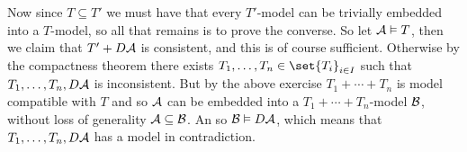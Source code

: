 Now since $T\subseteq T'$ we must have that every $T'$-model can be trivially embedded into a $T$-model, so all that remains is to prove the converse.
So let ${\cal A}\vDash T$, then we claim that $T'+D{\cal A}$ is consistent, and this is of course sufficient.
Otherwise by the compactness theorem there exists $T_1,\dots,T_n\in\set{T_i}_{i\in I}$ such that $T_1,\dots,T_n,D{\cal A}$ is inconsistent.
But by the above exercise $T_1+\cdots+T_n$ is model compatible with $T$ and so ${\cal A}$ can be embedded into a $T_1+\cdots+T_n$-model ${\cal B}$, without loss of generality ${\cal A}\subseteq{\cal B}$.
An so ${\cal B}\vDash D{\cal A}$, which means that $T_1,\dots,T_n,D{\cal A}$ has a model in contradiction.

